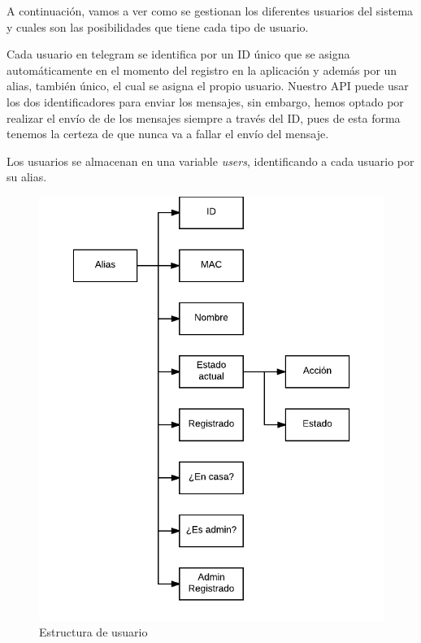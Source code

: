 \documentclass[10pt,journal,compsoc]{IEEEtran}
\begin{document}
A continuación, vamos a ver como se gestionan los diferentes usuarios del sistema y cuales 
son las posibilidades que tiene cada tipo de usuario.

Cada usuario en telegram se identifica por un ID único que se asigna automáticamente en 
el momento del registro en la aplicación y además por un alias, también único, el cual se asigna el 
propio usuario. Nuestro API puede usar los dos identificadores para enviar los  mensajes, sin embargo, 
hemos optado por realizar el envío de de los mensajes siempre a través del ID, pues de esta forma 
tenemos la certeza de que nunca va a fallar el envío del mensaje. 

Los usuarios se almacenan en una variable \textit{users}, identificando a cada usuario por su alias.

\begin{figure}[h]
\centering
\includegraphics[scale=0.5]{UserEst}
\caption{Estructura de usuario}
\label{fig:UserEst}
\end{figure}
\end{document}
